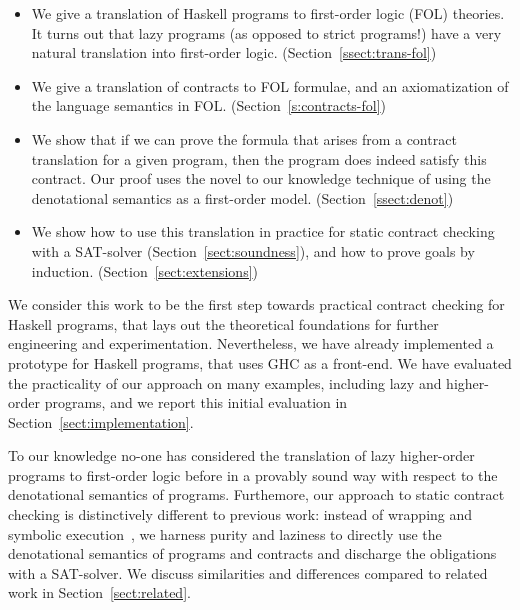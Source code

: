 \begin{itemize}
  \item We give a translation of Haskell programs to first-order logic (FOL) theories. 
        It turns out that lazy programs (as opposed to
        strict programs!) have a very natural translation into first-order logic.
        (Section~\ref{ssect:trans-fol}) 
  \item We give a translation of contracts to FOL formulae, and an axiomatization of 
        the language semantics in FOL. 
        (Section~\ref{s:contracts-fol})
  \item We show that if we can prove the formula that arises from a contract translation 
        for a given program, then the program does indeed satisfy this contract. Our proof
        uses the novel to our knowledge technique of using the denotational 
        semantics as a first-order model. (Section~\ref{ssect:denot})
  \item We show how to use this translation in practice for static contract checking with
        a SAT-solver (Section~\ref{sect:soundness}), 
        and how to prove goals by induction. (Section~\ref{sect:extensions})
\end{itemize}

We consider this work to be the first step towards practical contract checking 
for Haskell programs, that lays out the theoretical foundations for further engineering 
and experimentation. Nevertheless, we have already implemented a prototype for Haskell 
programs, that uses GHC as a front-end. We have evaluated the practicality of our approach 
on many examples, including lazy and higher-order programs, and we report this initial 
evaluation in Section~\ref{sect:implementation}.

To our knowledge no-one has considered the translation of lazy higher-order programs to 
first-order logic before in a provably sound way with respect to the denotational
semantics of programs. Furthemore, our approach to static contract checking is 
distinctively different to previous work: instead of wrapping and 
symbolic execution~\cite{xu+:contracts,Xu:2012:HCC:2103746.2103767}, 
we harness purity and laziness to directly use the denotational semantics
of programs and contracts and discharge the obligations with a SAT-solver.
We discuss similarities and differences compared to related work in Section~\ref{sect:related}.


        
